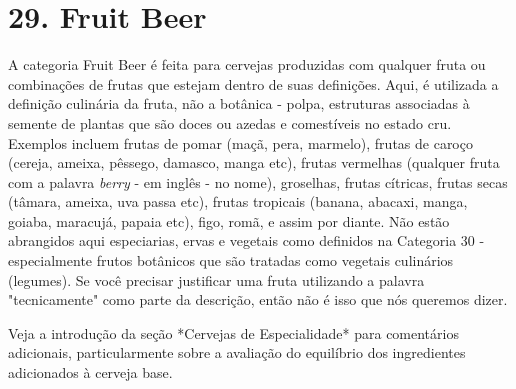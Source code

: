 \section*{29. Fruit Beer}

A categoria Fruit Beer é feita para cervejas produzidas com qualquer fruta ou combinações de frutas que estejam dentro de suas definições. Aqui, é utilizada a definição culinária da fruta, não a botânica - polpa, estruturas associadas à semente de plantas que são doces ou azedas e comestíveis no estado cru. Exemplos incluem frutas de pomar (maçã, pera, marmelo), frutas de caroço (cereja, ameixa, pêssego, damasco, manga etc), frutas vermelhas (qualquer fruta com a palavra \textit{berry} - em inglês - no nome), groselhas, frutas cítricas, frutas secas (tâmara, ameixa, uva passa etc), frutas tropicais (banana, abacaxi, manga, goiaba, maracujá, papaia etc), figo, romã, e assim por diante. Não estão abrangidos aqui especiarias, ervas e vegetais como definidos na Categoria 30 - especialmente frutos botânicos que são tratadas como vegetais culinários (legumes). Se você precisar justificar uma fruta utilizando a palavra "tecnicamente" como parte da descrição, então não é isso que nós queremos dizer.

Veja a introdução da seção *Cervejas de Especialidade* para comentários adicionais, particularmente sobre a avaliação do equilíbrio dos ingredientes adicionados à cerveja base.
